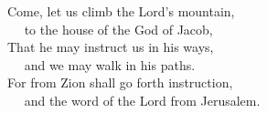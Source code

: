 
\lettrine{C}{}ome, let us climb the Lord’s mountain,\\
   to the house of the God of Jacob,\\
That he may instruct us in his ways,\\
   and we may walk in his paths.\\
For from Zion shall go forth instruction,\\
   and the word of the Lord from Jerusalem.
